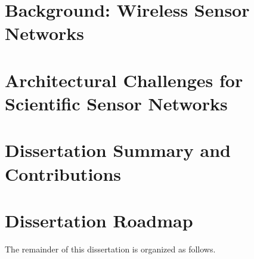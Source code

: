 \section{Background: Wireless Sensor Networks}

\section{Architectural Challenges for Scientific Sensor Networks}

\section{Dissertation Summary and Contributions}

\section{Dissertation Roadmap}

The remainder of this dissertation is organized as follows.

